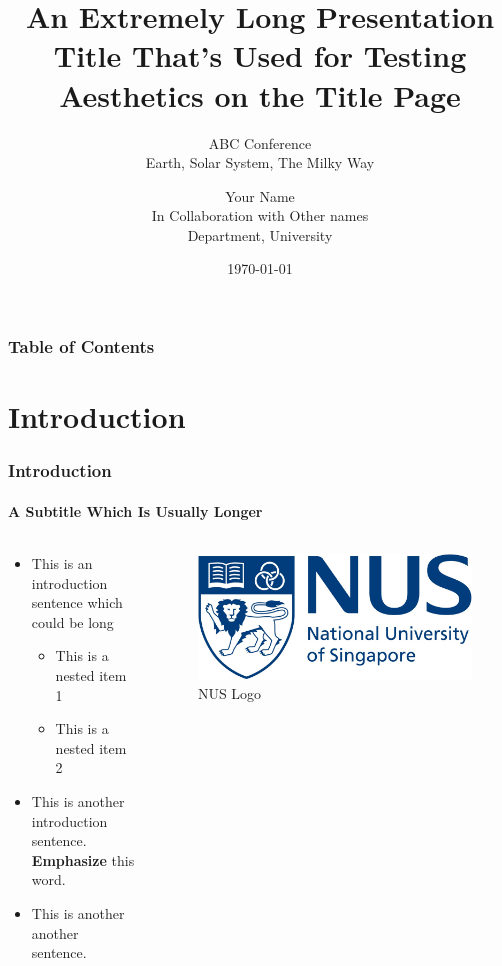 \documentclass[aspectratio=169]{beamer}
\title{An Extremely Long Presentation Title That's Used for Testing Aesthetics on the Title Page}
\subtitle{ABC Conference\\Earth, Solar System, The Milky Way}
\author[Your Name]{Your Name\\
        In Collaboration with Other names\\
        Department, University}
\institute{Your Institute}
\date{\today}
\renewcommand{\emph}[1]{{\color{NUSOrange}\textbf{#1}}}
\begin{document}
\begin{frame}
    \titlepage
\end{frame}

\begin{frame}
    \frametitle{Table of Contents}
    \tableofcontents
\end{frame}

\section{Introduction}
\begin{frame}
    \frametitle{Introduction}
    \framesubtitle{A Subtitle Which Is Usually Longer}
    
    \begin{columns}
        \begin{column}{0.5\textwidth}
            \linespread{1.5}\selectfont %
            \begin{itemize}
                \item This is an introduction sentence which could be long
                \begin{itemize}
                    \item This is a nested item 1
                    \item This is a nested item 2
                \end{itemize}
                \item This is another introduction sentence. \emph{Emphasize} this word.
                \item This is another another sentence.
            \end{itemize}
        \end{column}
        \begin{column}{0.5\textwidth}
            \begin{figure}
                \includegraphics[width=0.6\linewidth]{assets/nus-logo-blue-horizontal.jpg}
                \caption{NUS Logo}
                \label{fig:logo}
            \end{figure}
        \end{column}
    \end{columns}
\end{frame}
\end{document}
